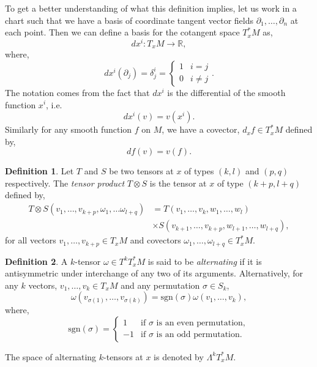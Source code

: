 \documentclass[12pt,a4paper]{article}
\numberwithin{equation}{section}
\theoremstyle{definition}
\newtheorem{definition}{Definition}[section]
\theoremstyle{remark}
\begin{document}
To get a better understanding of what this definition implies, let us work in a chart such that we have a basis of coordinate tangent vector fields $\partial_1,\ldots,\partial_n$ at each point. Then we can define a basis for the cotangent space $T^*_xM$ as,
\[
dx^i:T_xM\to\mathbb{R},
\]
where,
\[
dx^i(\partial_j)=\delta^i_j=\begin{cases}
1 & i=j\\
0 & i\neq j
\end{cases}.
\]
The notation comes from the fact that $dx^i$ is the differential of the smooth function $x^i$, i.e.
\[
dx^i(v)=v(x^i).
\]
Similarly for any smooth function $f$ on $M$, we have a covector, $d_xf\in T^*_xM$ defined by,
\[
df(v)=v(f).
\]
\begin{definition}
Let $T$ and $S$ be two tensors at $x$ of types $(k,l)$ and $(p,q)$ respectively. The \textit{tensor product} $T\otimes S$ is the tensor at $x$ of type $(k+p,l+q)$ defined by,
\begin{align*}
T\otimes S(v_1,\ldots,v_{k+p},\omega_1,\ldots\omega_{l+q})&=T\left(v_1,\ldots,v_k,w_1,\ldots,w_l \right)\\
&\times S\left(v_{k+1},\ldots,v_{k+p},w_{l+1},\ldots,w_{l+q} \right),
\end{align*}
for all vectors $v_1,\ldots,v_{k+p}\in T_xM$ and covectors $\omega_1,\ldots,\omega_{l+q}\in T^*_xM$.
\end{definition}
\begin{definition}
A $k$-tensor $\omega\in T^kT^*_xM$ is said to be \textit{alternating} if it is antisymmetric under interchange of any two of its arguments. Alternatively, for any $k$ vectors, $v_1,\ldots,v_k\in T_xM$ and any permutation $\sigma\in S_k$,
\[
\omega(v_{\sigma(1)},\ldots,v_{\sigma(k)})=\mathrm{sgn}(\sigma)\omega(v_1,\ldots,v_k),
\]
where,
\[
\mathrm{sgn}(\sigma)=\begin{cases}
1 & \text{if }\sigma\text{ is an even permutation},\\
-1 & \text{if }\sigma\text{ is an odd permutation}.
\end{cases}
\]
\end{definition}
The space of alternating $k$-tensors at $x$ is denoted by $\Lambda^kT^*_xM$.
\end{document}
